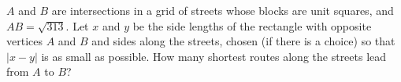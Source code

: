 $A$ and $B$ are intersections in a grid of streets whose blocks are unit squares, and $AB=\sqrt{313}$. Let $x$ and $y$ be the side lengths of the rectangle with opposite vertices $A$ and $B$ and sides along the streets, chosen (if there is a choice) so that $|x-y|$ is as small as possible. How many shortest routes along the streets lead from $A$ to $B$?

